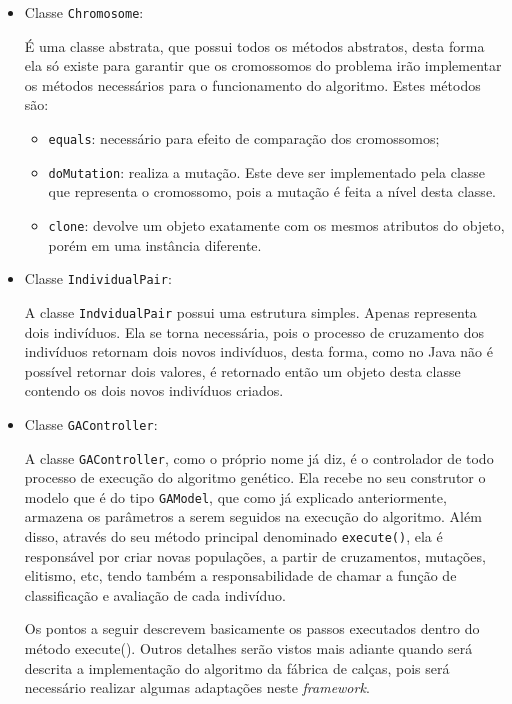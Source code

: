 \begin{itemize}
	
	\item Classe \texttt{Chromosome}:
	\par É uma classe abstrata, que possui todos os métodos abstratos, desta forma
	ela só existe para garantir que os cromossomos do problema irão implementar os
	métodos necessários para o funcionamento do algoritmo. Estes métodos são:
	
	\begin{itemize}
		
		\item \texttt{equals}: necessário para efeito de comparação dos cromossomos;
		
		\item \texttt{doMutation}: realiza a mutação. Este deve
		ser implementado pela classe que representa o cromossomo, pois a
		mutação é feita a nível desta classe.
		
		\item \texttt{clone}: devolve um objeto exatamente com os mesmos
		atributos do objeto, porém em uma instância diferente.
		
	\end{itemize}
	
	
	\item Classe \texttt{IndividualPair}:
	\par A classe \texttt{IndvidualPair} possui uma estrutura simples. Apenas
	representa dois indivíduos. Ela se torna necessária, pois o processo de
	cruzamento dos indivíduos retornam dois novos indivíduos, desta forma, como 
	no Java não é possível retornar dois valores, é retornado então um objeto desta
	classe contendo os dois novos indivíduos criados. 
	
	
	\item Classe \texttt{GAController}:
	\par A classe \texttt{GAController}, como o próprio nome já diz, é o
	controlador de todo processo de execução do algoritmo genético.
	Ela recebe no seu construtor o modelo que é do tipo \texttt{GAModel}, que como
	já explicado anteriormente, armazena os parâmetros a serem seguidos na
	execução do algoritmo. Além disso, através do seu método principal
	denominado \texttt{execute()}, ela é responsável por criar novas populações, a
	partir de cruzamentos, mutações, elitismo, etc, tendo também a
	responsabilidade de chamar a função de classificação e avaliação de cada indivíduo.
	
	\par Os pontos a seguir descrevem basicamente os passos executados dentro do
	método execute(). Outros detalhes serão vistos mais adiante quando será
	descrita a implementação do algoritmo da fábrica de calças, pois será
	necessário realizar algumas adaptações neste \textit{framework}.
	

\end{itemize}
